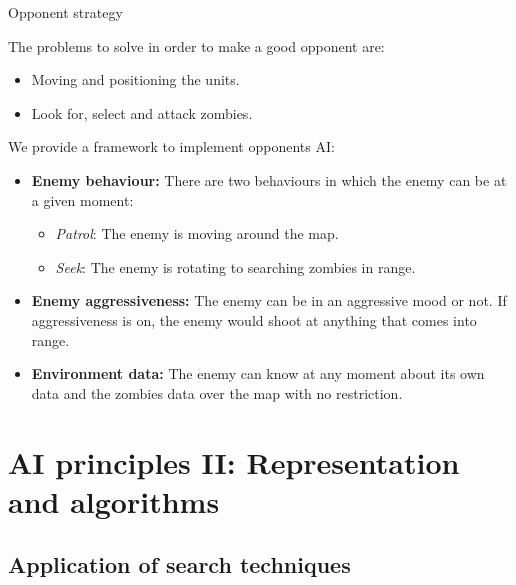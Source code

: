 \documentclass[10pt]{beamer}
\begin{document}
	      \begin{frame}{Opponent strategy}
		  \footnotesize

		  The problems to solve in order to make a good opponent are:

		    \begin{itemize}
		    \item Moving and positioning the units.
		    \item Look for, select and attack zombies.
		    \newline
		    \end{itemize}


		  We provide a framework to implement opponents AI:

		      \begin{itemize}
		      \item \textbf{Enemy behaviour:} There are two behaviours in which the enemy can be at a given moment:
			  \begin{itemize}  \footnotesize
			      \item \textit{Patrol}: The enemy is moving around the map.
			      \item \textit{Seek}: The enemy is rotating to searching zombies in range.
			    \end{itemize}

		      \item \textbf{Enemy aggressiveness:} The enemy can be in an aggressive mood or not. If aggressiveness is on, the enemy would shoot at anything that comes into range.
		      \item \textbf{Environment data:} The enemy can know at any moment about its own data and the zombies data over the map with no restriction.
		      \end{itemize}
	       
	      \end{frame}


	\section{AI principles II: Representation and algorithms}

	    \subsection{Application of search techniques}
    
\end{document}
